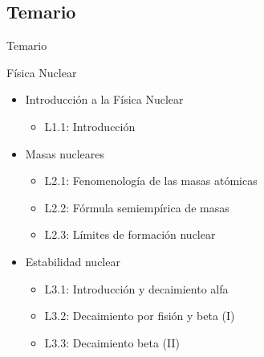 \documentclass{beamer}
\begin{document}
\subsection{Temario}
\begin{frame}{Temario}
    \begin{Large}Física Nuclear\end{Large}
    \begin{itemize}
        \item Introducción a la Física Nuclear
\begin{itemize}
        \item L1.1: Introducción
\end{itemize}        
        \item Masas nucleares
\begin{itemize}
        \item L2.1: Fenomenología de las masas atómicas
        \item L2.2: Fórmula semiempírica de masas
        \item L2.3: Límites de formación nuclear
\end{itemize} 
        \item Estabilidad nuclear
\begin{itemize}
        \item L3.1: Introducción y decaimiento alfa   
        \item L3.2: Decaimiento por fisión y beta (I)
        \item L3.3: Decaimiento beta (II)
\end{itemize}      
    \end{itemize}
\end{frame}
\end{document}
